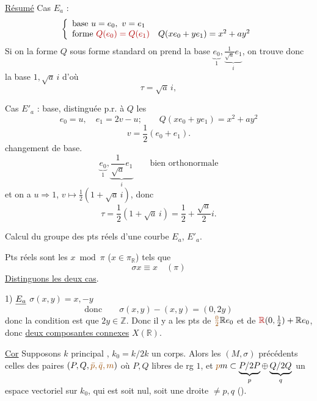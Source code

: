 \uline{Résumé} Cas $E_a$ :
\[
\left\{\begin{array}{l}
\text{base }u=e_0,\ v=e_1\\
\text{forme }\deleted{Q(e_0)=Q(e_1)}\quad Q(xe_0+ye_1)=x^2+ay^2
\end{array}\right.
\]
Si on  la forme $Q$ sous forme standard on
prend la  base
$\underbrace{e_0}_{1},\underbrace{\frac1{\sqrt a}e_1}_{i}$, on trouve donc la base
$1,\sqrt a\,i$ d'où
\[\boxed{\tau=\sqrt a\,i},\]

Cas $E'_a$ : base, 
distinguée p.r. à $Q$ les
\[
e_0=u,\quad e_1=2v-u;\qquad Q(xe_0+ye_1)=x^2+ay^2
\]
\[v=\frac12(e_0+e_1).\]
  changement de base.
\[
\underbrace{e_0}_{1},\underbrace{\frac1{\sqrt a}e_1}_{i}
\qquad\text{bien orthonormale}
\]
et on a $u\Rightarrow1$, $v\mapsto\frac12(1+\sqrt a\,i)$, donc
\[\boxed{\tau=\frac12(1+\sqrt a\,i)}=\frac12+\frac{\sqrt a}{2}i.\]

Calcul du groupe des pts réels d'une courbe $E_a$, $E'_a$.

Pts réels sont les $x\bmod\pi$ ($x\in\pi_{\mathbb R}$) tels que
\[\sigma x\equiv x\quad(\pi)\]
\uline{Distinguons les deux cas}.

1) $\uline{E_a}$  $\sigma(x,y)=x,-y$
\[\text{donc}\qquad\sigma(x,y)-(x,y)=(0,2y)\]
donc la condition est que $2y\in\mathbb Z$. Donc il y a 
les pts de $\deleted{\unsure{\frac02}}\mathbb R e_0$ et de
$\deleted{\mathbb R}(0,\frac12)+\mathbb R e_0$, donc
\uline{deux composantes connexes}  $X(\mathbb R)$.

\margin{$\unsure{<}$}

\uline{Cor} Supposons $k$ principal , $k_0=k/2k$ un corps.
Alors les $(M,\sigma)$  précédents
 celles des paires $(P,Q,\deleted{\unsure{\bar p,\bar q,m}})$ où $P,Q$ libres de rg $1$,
et $\deleted{\unsure{p}}m\subset\underbrace{P/2P}_{p}\oplus\underbrace{Q/2Q}_{q}$ un espace vectoriel sur $k_0$,
qui est soit nul, soit une droite $\ne p,q$ ().

